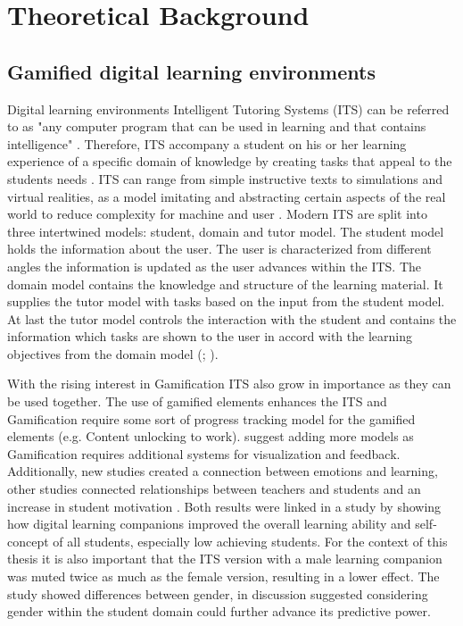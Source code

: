 \section{Theoretical Background}

\subsection{Gamified digital learning environments}
Digital learning environments
Intelligent Tutoring Systems (ITS) can be referred to as "any computer program that can be used in learning and that contains intelligence" \>\parencite{freedmanLinksWhatIntelligent2000}.
Therefore, ITS accompany a student on his or her learning experience of a specific domain of knowledge by creating tasks that appeal to the students needs \parencite{gonzalezGamificationIntelligentTutoring2014}.
ITS can range from simple instructive texts to simulations and virtual realities, as a model imitating and abstracting certain aspects of the real world to reduce complexity for machine and user \parencite{psotkaIntelligentTutoringSystems1988}.
Modern ITS are split into three intertwined models: student, domain and tutor model. The student model holds the information about the user.
The user is characterized from different angles the information is updated as the user advances within the ITS.
The domain model contains the knowledge and structure of the learning material. It supplies the tutor model with tasks based on the input from the student model.
At last the tutor model controls the interaction with the student and contains the information which tasks are shown to the user in accord with the learning objectives from the domain model (\cite{gonzalezGamificationIntelligentTutoring2014}; \cite{freedmanLinksWhatIntelligent2000}).

With the rising interest in Gamification ITS also grow in importance as they can be used together. The use of gamified elements enhances the ITS and Gamification require some sort of progress tracking model for the gamified elements (e.g. Content unlocking to work).
\Textcite{gonzalezGamificationIntelligentTutoring2014} suggest adding more models as Gamification requires additional systems for visualization and feedback.
Additionally, new studies created a connection between emotions and learning, other studies connected relationships between teachers and students and an increase in student motivation \parencite{woolfAffectiveTutorsAutomatic2010}.
Both results were linked in a study by \Textcite{woolfAffectiveTutorsAutomatic2010} showing how digital learning companions improved the overall learning ability and self-concept of all students, especially low achieving students.
For the context of this thesis it is also important that the ITS version with a male learning companion was muted twice as much as the female version, resulting in a lower effect.
The study showed differences between gender, in discussion \Textcite{woolfAffectiveTutorsAutomatic2010} suggested considering gender within the student domain could further advance its predictive power.


